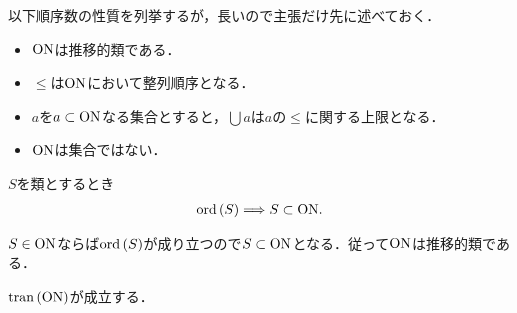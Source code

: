 	以下順序数の性質を列挙するが，長いので主張だけ先に述べておく．
	\begin{itemize}
		\item $\mathrm{ON}$は推移的類である．
		\item $\leq$は$\mathrm{ON}$において整列順序となる．
		\item $a$を$a \subset \mathrm{ON}$なる集合とすると，$\bigcup a$は$a$の$\leq$に関する上限となる．
		\item $\mathrm{ON}$は集合ではない．
	\end{itemize}
	
	\begin{screen}
		\begin{thm}
			$S$を類とするとき
			\begin{align}
				\operatorname*{ord} \left(S\right) \Longrightarrow S \subset \mathrm{ON}.
			\end{align}
		\end{thm}
	\end{screen}
	
	$S \in \mathrm{ON}$ならば$\operatorname*{ord} \left(S\right)$が成り立つので$S \subset \mathrm{ON}$となる．従って$\mathrm{ON}$は推移的類である．
	
	\begin{screen}
		\begin{thm}[順序数全体は推移的]\label{thm:On_is_transitive}
			$\operatorname*{tran} \left(\mathrm{ON}\right)$が成立する．
		\end{thm}
	\end{screen}
	
